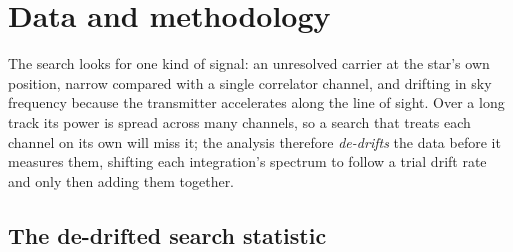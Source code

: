 \section{Data and methodology}
\label{sec:method}

The search looks for one kind of signal: an unresolved carrier at the star's
own position, narrow compared with a single correlator channel, and drifting in
sky frequency because the transmitter accelerates along the line of sight. Over
a long track its power is spread across many channels, so a search that treats
each channel on its own will miss it; the analysis therefore \emph{de-drifts}
the data before it measures them, shifting each integration's spectrum to
follow a trial drift rate and only then adding them together.

\subsection{The de-drifted search statistic}
\label{sec:statistic}

